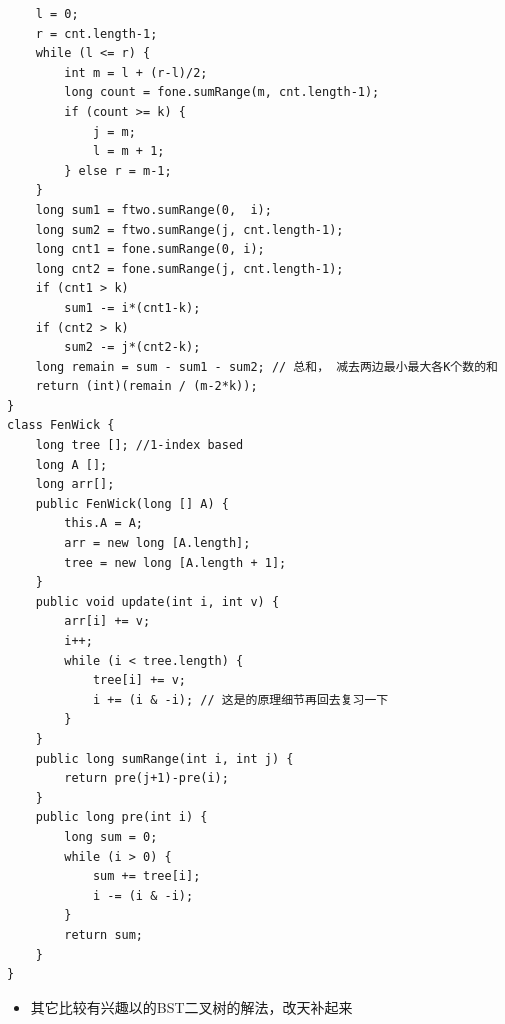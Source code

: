 \documentclass[9pt, b5paaper]{book}
\begin{document}
\begin{enumerate}
\begin{verbatim}
    l = 0;
    r = cnt.length-1;
    while (l <= r) {
        int m = l + (r-l)/2;
        long count = fone.sumRange(m, cnt.length-1);
        if (count >= k) {
            j = m;
            l = m + 1;
        } else r = m-1;
    }
    long sum1 = ftwo.sumRange(0,  i);
    long sum2 = ftwo.sumRange(j, cnt.length-1);
    long cnt1 = fone.sumRange(0, i);
    long cnt2 = fone.sumRange(j, cnt.length-1);
    if (cnt1 > k)
        sum1 -= i*(cnt1-k);
    if (cnt2 > k)
        sum2 -= j*(cnt2-k);
    long remain = sum - sum1 - sum2; // 总和， 减去两边最小最大各K个数的和
    return (int)(remain / (m-2*k));
}
class FenWick {
    long tree []; //1-index based
    long A [];
    long arr[];
    public FenWick(long [] A) {
        this.A = A;
        arr = new long [A.length];
        tree = new long [A.length + 1];
    }
    public void update(int i, int v) {
        arr[i] += v;
        i++;
        while (i < tree.length) {
            tree[i] += v;
            i += (i & -i); // 这是的原理细节再回去复习一下
        }
    }
    public long sumRange(int i, int j) {
        return pre(j+1)-pre(i);
    }
    public long pre(int i) {
        long sum = 0;
        while (i > 0) {
            sum += tree[i];
            i -= (i & -i);
        }
        return sum;
    }
}
\end{verbatim}
\begin{itemize}
\item 其它比较有兴趣以的BST二叉树的解法，改天补起来
\end{itemize}
\end{enumerate}
\end{document}
